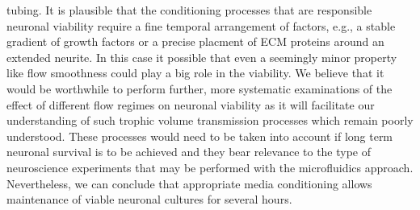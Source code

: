 tubing. It is plausible that the conditioning processes that are responsible neuronal viability require a fine temporal arrangement of factors, e.g., a stable gradient of growth factors or a precise placment of ECM proteins around an extended neurite. In this case it possible that even a seemingly minor property like flow smoothness could play a big role in the viability. We believe that it would be worthwhile to perform further, more systematic examinations of the effect of different flow regimes on neuronal viability as it will facilitate our understanding of such trophic volume transmission processes which remain poorly understood. These processes would need to be taken into account if long term neuronal survival is to be achieved and they bear relevance to the type of neuroscience experiments that may be performed with the microfluidics approach. Nevertheless, we can conclude that appropriate media conditioning allows maintenance of viable neuronal cultures for several hours.

